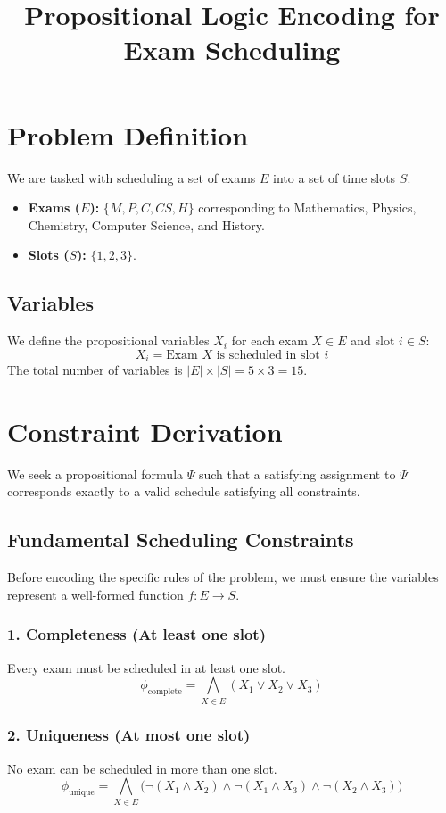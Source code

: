 \documentclass[12pt, a4paper]{article}
\title{\textbf{Propositional Logic Encoding for Exam Scheduling}}
\author{}
\date{}
\begin{document}
\maketitle

\section{Problem Definition}

We are tasked with scheduling a set of exams $E$ into a set of time slots $S$.

\begin{itemize}
    \item \textbf{Exams ($E$):} $\{M, P, C, CS, H\}$ corresponding to Mathematics, Physics, Chemistry, Computer Science, and History.
    \item \textbf{Slots ($S$):} $\{1, 2, 3\}$.
\end{itemize}

\subsection{Variables}
We define the propositional variables $X_i$ for each exam $X \in E$ and slot $i \in S$:
$$ X_i = \text{Exam } X \text{ is scheduled in slot } i $$
The total number of variables is $|E| \times |S| = 5 \times 3 = 15$.

\section{Constraint Derivation}

We seek a propositional formula $\Psi$ such that a satisfying assignment to $\Psi$ corresponds exactly to a valid schedule satisfying all constraints.

\subsection{Fundamental Scheduling Constraints}
Before encoding the specific rules of the problem, we must ensure the variables represent a well-formed function $f: E \to S$.

\subsubsection*{1. Completeness (At least one slot)}
Every exam must be scheduled in at least one slot.
$$ \phi_{\text{complete}} = \bigwedge_{X \in E} (X_1 \lor X_2 \lor X_3) $$

\subsubsection*{2. Uniqueness (At most one slot)}
No exam can be scheduled in more than one slot.
$$ \phi_{\text{unique}} = \bigwedge_{X \in E} \big( \neg(X_1 \land X_2) \land \neg(X_1 \land X_3) \land \neg(X_2 \land X_3) \big) $$
\end{document}
